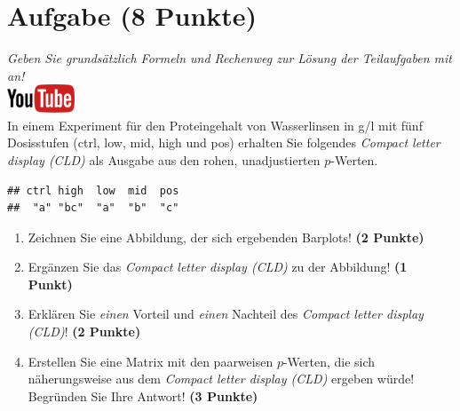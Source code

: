 \documentclass[a4paper, 9pt]{scrartcl}\usepackage[]{graphicx}\usepackage[]{xcolor}
\makeatletter
\newenvironment{kframe}{%
 \def\at@end@of@kframe{}%
 \ifinner\ifhmode%
  \def\at@end@of@kframe{\end{minipage}}%
  \begin{minipage}{\columnwidth}%
 \fi\fi%
 \def\FrameCommand##1{\hskip\@totalleftmargin \hskip-\fboxsep
 \colorbox{shadecolor}{##1}\hskip-\fboxsep
     \hskip-\linewidth \hskip-\@totalleftmargin \hskip\columnwidth}%
 \MakeFramed {\advance\hsize-\width
   \@totalleftmargin\z@ \linewidth\hsize
   \@setminipage}}%
 {\par\unskip\endMakeFramed%
 \at@end@of@kframe}
\newenvironment{knitrout}{}{} %
\makeatother
\begin{document}
\vspace{1Ex}

 
\clearpage

\section{Aufgabe \hfill (8 Punkte)}

\textit{Geben Sie grunds{\"a}tzlich Formeln und Rechenweg zur L{\"o}sung der
  Teilaufgaben mit an!} \\[1Ex]

 \hfill\href{https://youtu.be/xq29O8qDrg0}{\includegraphics[width =
   2cm]{img/youtube}}\\[1Ex]


 
 In einem Experiment f{\"u}r den Proteingehalt von Wasserlinsen in g/l mit f{\"u}nf
 Dosisstufen (ctrl, low, mid, high und pos) erhalten Sie folgendes \textit{Compact
   letter display (CLD)} als \Rlogo Ausgabe aus den rohen, unadjustierten
 $p$-Werten.



\begin{knitrout}
\color{fgcolor}\begin{kframe}
\begin{verbatim}
## ctrl high  low  mid  pos 
##  "a" "bc"  "a"  "b"  "c"
\end{verbatim}
\end{kframe}
\end{knitrout}

\begin{enumerate}
\item Zeichnen Sie eine Abbildung, der sich ergebenden Barplots! \textbf{(2 Punkte)}
\item Erg{\"a}nzen Sie das \textit{Compact letter display (CLD)} zu der
  Abbildung! \textbf{(1 Punkt)}
\item Erkl{\"a}ren Sie \textit{einen} Vorteil und \textit{einen} Nachteil des
  \textit{Compact letter display (CLD)}! \textbf{(2 Punkte)}
\item Erstellen Sie eine Matrix mit den paarweisen $p$-Werten, die sich
  n{\"a}herungsweise aus dem \textit{Compact letter display (CLD)} ergeben w{\"u}rde! Begr{\"u}nden Sie Ihre Antwort! \textbf{(3 Punkte)}
\end{enumerate}
\end{document}
